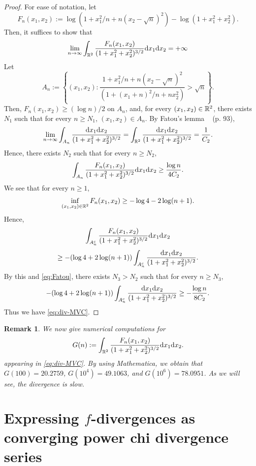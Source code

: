 \documentclass[journal]{IEEEtran}
\newtheorem{remark}[theorem]{Remark}
\begin{document}
\begin{proof}
For ease of notation, let 
\[ F_n (x_1, x_2) :=  \log \left( 1+ x_1^2/n + n(x_2 - \sqrt{n})^2 \right) - \log \left(1+ x_1^2 + x_2^2 \right). \]
Then, it suffices to show that 
\begin{equation}\label{eq:div-MVC}
\lim_{n \to \infty} \int_{\bbR^2}\frac{F_n (x_1, x_2)}{(1 + x_1^2 + x_2^2)^{3/2}} \dx_1 \dx_2 = +\infty 
\end{equation}
Let 
\[ A_n := \left\{(x_1, x_2) :  \frac{1+ x_1^2 / n + n (x_2 - \sqrt{n})^2}{\left( 1+ (x_1 + n)^2 / n + n x_2^2 \right)} > \sqrt{n}  \right\}. \]
Then, $F_n (x_1, x_2) \ge (\log n) / 2$ on $A_n$, and, for every $(x_1, x_2) \in {\mathbb{R}}^2$, there exists $N_1$ such that for every $n \ge N_1$, $(x_1, x_2) \in A_n$. 
By Fatou's lemma ~\cite{Kesavan-2019} (p. 93), 
\begin{equation}\label{eq:Fatou}
\lim_{n \to \infty} \int_{A_n} \frac{\dx_1\dx_2}{(1 + x_1^2 + x_2^2)^{3/2}}  = \int_{\bbR^2} \frac{\dx_1\dx_2}{(1 + x_1^2 + x_2^2)^{3/2}} = \frac{1}{C_2}. 
\end{equation}
Hence, 
there exists $N_2$ such that for every $n \ge N_2$, 
\[ \int_{A_n} \frac{F_n (x_1, x_2)}{(1 + x_1^2 + x_2^2)^{3/2}} \mathrm{d}x_1\mathrm{d}x_2 \ge \frac{\log n}{4 C_2}. \]
We see that for every $n \ge 1$, 
\[ \inf_{(x_1, x_2) \in {\mathbb{R}}^2} F_n (x_1, x_2) \ge - \log 4 - 2\log(n+1). \]
Hence, 
\[ \int_{A_n^c} \frac{F_n (x_1, x_2)}{(1 + x_1^2 + x_2^2)^{3/2}} \mathrm{d}x_1\mathrm{d}x_2 \]
\[\ge - (\log 4 + 2\log(n+1)) \int_{A_n^c} \frac{\mathrm{d}x_1\mathrm{d}x_2}{(1 + x_1^2 + x_2^2)^{3/2}}. \]
By this and \eqref{eq:Fatou}, 
there exists $N_3 > N_2$ such that for every $n \ge N_3$, 
\[- (\log 4 + 2\log(n+1)) \int_{A_n^c} \frac{\mathrm{d}x_1\mathrm{d}x_2}{(1 + x_1^2 + x_2^2)^{3/2}} \ge -\frac{\log n}{8C_2}. \]
Thus we have \eqref{eq:div-MVC}. 
\end{proof}

\begin{remark}
We now give numerical computations for 
\[ G(n) := \int_{{\mathbb{R}}^2}\frac{F_n (x_1, x_2)}{(1 + x_1^2 + x_2^2)^{3/2}} \mathrm{d}x_1 \mathrm{d}x_2. \]
appearing in \eqref{eq:div-MVC}. 
By using Mathematica, we obtain that 
$G(100) = 20.2759$, $G(10^4) = 49.1063$, and $G(10^6) = 78.0951$. 
As we will see, the divergence is slow. 
\end{remark}





\section{Expressing $f$-divergences as converging power chi divergence series}\label{sec:Taylor}
\end{document}
